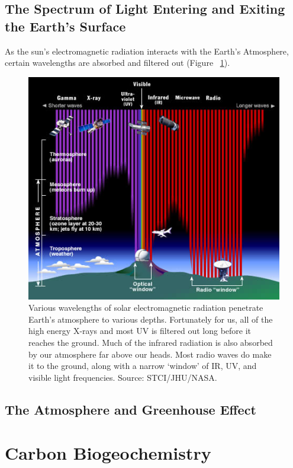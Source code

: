 \documentclass{book}\usepackage{knitr}
\begin{document}
\subsection{The Spectrum of Light Entering and Exiting the Earth's Surface}

As the sun's electromagnetic radiation interacts with the Earth's Atmosphere, certain wavelengths are absorbed and filtered out (Figure~ \ref{fig:em-entering}).

\begin{figure}
\includegraphics[width=\linewidth]{images/earth-system/em-radiation-atmosph-depth-stsci.jpg}
\caption{Various wavelengths of solar electromagnetic radiation penetrate Earth's atmosphere to various depths. Fortunately for us, all of the high energy X-rays and most UV is filtered out long before it reaches the ground. Much of the infrared radiation is also absorbed by our atmosphere far above our heads. Most radio waves do make it to the ground, along with a narrow `window' of IR, UV, and visible light frequencies. Source: STCI/JHU/NASA.}
\label{fig:em-entering}
\end{figure}

\subsection{The Atmosphere and Greenhouse Effect}



\section{Carbon Biogeochemistry}
\end{document}
